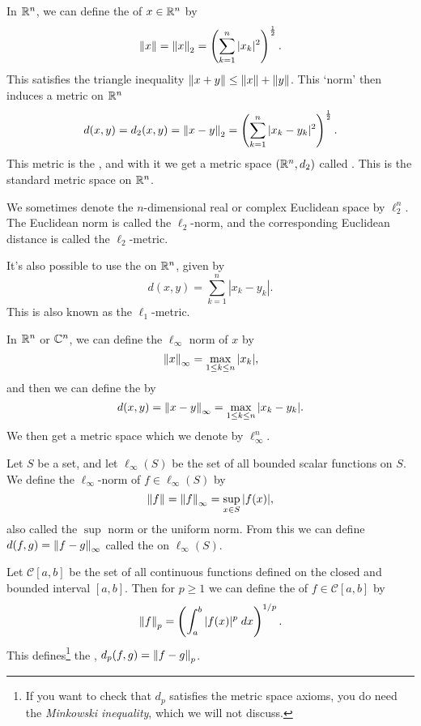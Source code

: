 \documentclass[a4paper]{scrartcl}
\begin{document}
\begin{example}
   In $\mathbb{R}^n$, we can define the 
   of $x \in \mathbb{R}^n$ by
   $$
    \norm{x} = \norm{x}_2 = \left(\sum_{k = 1}^n |x_k|^2\right)^{\frac{1}{2}}.
   $$
   This satisfies the triangle inequality $\norm{x + y} \leq \norm{x} + \norm{y}$. This `norm' then induces a metric on $\mathbb{R}^n$
   $$
    d(x, y) = d_2(x, y) = \norm{x - y}_2 = \left(\sum_{k = 1}^n |x_k - y_k|^2\right)^{\frac{1}{2}}.
   $$
   This metric is the , and with it we get a metric space $(\mathbb{R}^n, d_2)$ called . This is the standard metric space on $\mathbb{R}^n$.
\end{example}
\begin{remark}
    We sometimes denote the $n$-dimensional real or complex Euclidean space by $\ell_2^n$. The Euclidean norm is called the $\ell_2$-norm, and the corresponding Euclidean distance is called the $\ell_2$-metric.
\end{remark}

\begin{example}
It's also possible to use the  on $\mathbb{R}^n$, given by
$$
d(x, y) = \sum_{k = 1}^{n} |x_k - y_k|.
$$
This is also known as the $\ell_1$-metric.
\end{example}

\begin{example}
In $\mathbb{R}^n$ or $\mathbb{C}^n$, we can define the $\ell_{\infty}$ norm of $x$ by
$$
    \norm{x}_{\infty} = \max_{1 \leq k \leq n} |x_k|,
$$
and then we can define the  by
$$
d(x, y) = \norm{x - y}_{\infty} = \max_{1 \leq k \leq n} |x_k - y_k|.
$$
We then get a metric space which we denote by $\ell_{\infty}^n$.
\end{example}

\begin{example}
    Let $S$ be a set, and let $\ell_{\infty}(S)$ be the set of all bounded scalar functions on $S$. We define the $\ell_{\infty}$-norm of $f \in \ell_{\infty}(S)$ by
    $$
    \norm{f} = \norm{f}_{\infty} = \sup_{x \in S}|f(x)|,
    $$
    also called the $\sup$ norm or the uniform norm. From this we can define $d(f, g) = \norm{f - g}_{\infty}$ called the  on $\ell_{\infty}(S)$.
\end{example}

\begin{example}[$L_p$-Norm]
    Let $\mathcal{C}[a, b]$ be the set of all continuous functions defined on the closed and bounded interval $[a, b]$. Then for $p \geq 1$ we can define the  of $f \in \mathcal{C}[a, b]$ by
    $$
    \norm{f}_p = \left(\int_a^b |f(x)|^p \; d x\right)^{1/p}.
    $$
    This defines\footnote{If you want to check that $d_p$ satisfies the metric space axioms, you do need the \emph{Minkowski inequality}, which we will not discuss.} the , $d_p(f, g) = \norm{f - g}_{p}$.
\end{example}
\end{document}
